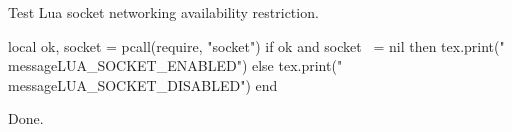 \documentclass{article}
\begin{document}
Test Lua socket networking availability restriction.
\begin{luacode*}
local ok, socket = pcall(require, "socket")
if ok and socket ~= nil then
  tex.print("\\message{LUA_SOCKET_ENABLED}")
else
  tex.print("\\message{LUA_SOCKET_DISABLED}")
end
\end{luacode*}
Done.
\end{document}
